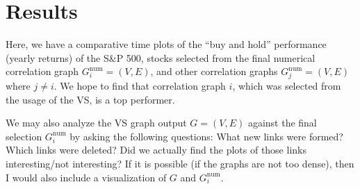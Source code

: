 \section{Results}
\label{sec:usage:results}

Here, we have a comparative time plots of the ``buy and hold'' performance 
(yearly returns) of the S\&P 500, stocks selected from the final numerical 
correlation graph $G_i^{\text{num}}=(V,E)$, and other correlation graphs 
$G_j^{\text{num}}=(V,E)$ where $j\neq i$. We hope to find that correlation 
graph 
$i$, which was selected from the usage of the VS, is a top performer.

We may also analyze the VS graph output $G=(V,E)$ against the final selection 
$G_i^{\text{num}}$ by asking the following questions: What new links were 
formed? Which links were deleted? Did we actually find the
plots of those links interesting/not interesting? If it is possible (if the 
graphs are not too dense), then I would also include a visualization of 
$G$ and $G_i^{\text{num}}$.
